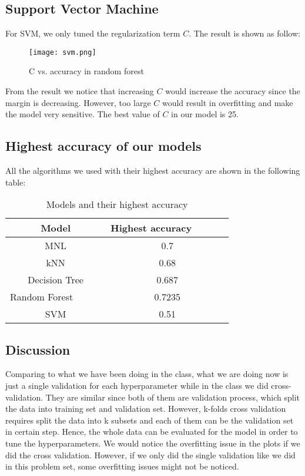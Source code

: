 \documentclass[11pt]{article}
\begin{document}
\subsection{Support Vector Machine}
For SVM, we only tuned the regularization term $C$. The result is shown as follow:
\begin{figure}[H]
	\centering
	\texttt{[image: svm.png]}     
	\caption{C vs. accuracy in random forest}
\end{figure}
\noindent From the result we notice that increasing $C$ would increase the accuracy since the margin is decreasing. However, too large $C$ would result in overfitting and make the model very sensitive. The best value of $C$ in our model is 25.
\newpage
\subsection{Highest accuracy of our models}
All the algorithms we used with their highest accuracy are shown in the following table:
\begin{table}[H]
	\caption{Models and their highest accuracy}
	\centering
	\begin{tabular}{cc}
		\hline
		\textbf{Model}&\textbf{Highest accuracy\ \ \ \ \ \ }\\
		\hline
		MNL&0.7\\
		kNN&0.68\\
		Decision Tree&0.687\\
		Random Forest\ \ \ \ \ \ &0.7235\\
		SVM&0.51\\
		\hline
	\end{tabular}
\end{table}
\subsection{Discussion}
Comparing to what we have been doing in the class, what we are doing now is just a single validation for each hyperparameter while in the class we did cross-validation. They are similar since both of them are validation process, which split the data into training set and validation set. However, k-folds cross validation requires split the data into k subsets and each of them can be the validation set in certain step. Hence, the whole data can be evaluated for the model in order to tune the hyperparameters. We would notice the overfitting issue in the plots if we did the cross validation. However, if we only did the single validation like we did in this problem set, some overfitting issues might not be noticed.
\newpage
\end{document}
